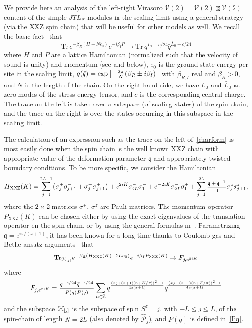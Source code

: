 \documentclass[11pt]{article}
\newcommand{\q}{\mathfrak{q}}
\newcommand{\ffrac}[2]{\mbox{\footnotesize$\displaystyle\frac{#1}{#2}$}}
\newcommand{\JTL}[1]{JTL_{#1}}
\newcommand{\HXXZ}{H_{\mathrm{XXZ}}(K)}
\newcommand{\PXXZ}{P_{\mathrm{XXZ}}(K)}
\newcommand{\oZ}{\mathbb{Z}}
\newcommand{\Vir}{\mathcal{V}}
\newcommand{\VirN}{\boldsymbol{\mathcal{V}}}
\newcommand{\APrTL}[1]{\widehat{\mathscr{P}}_{#1}}
\theoremstyle{definition}
\begin{document}
We provide here an  analysis of the left-right Virasoro $\VirN(2)=\Vir(2)\boxtimes\overline{\Vir}(2)$ content of the
simple $\JTL{N}$ modules in the scaling limit using a general strategy (via the XXZ spin chain) that will be useful for other models as well.
We recall the basic fact~\cite{Cardy} that
%
\begin{equation}
 \mathrm{Tr}\, e^{-\beta_R(H-Ne_0)}e^{-i\beta_I P}\to \mathrm{Tr}\, q^{L_0-c/24}\bar{q}^{\bar{L}_0-c/24}\label{charform}
 \end{equation}
where $H$ and $P$ are a lattice Hamiltonian (normalized such that
 the velocity of sound is unity) and momentum (see \cite{GRS1}
 and below), $e_0$ is the ground state energy per site in the
 scaling limit, $q(\bar{q})=\exp\left[-{2\pi\over N}(\beta_R\pm
 i\beta_I)\right]$ with $\beta_{R,I}$ real and $\beta_R>0$, and $N$ is
 the length of the chain. On the right-hand side, we have $L_0$ and $\bar{L}_0$ as zero modes of the stress-energy tensor, and $c$ is the corresponding central charge. The trace on the left is taken over a
 subspace (of scaling states) of the spin chain, and the trace on the right is over the
 states occurring in this subspace in the scaling limit.

The calculation of an expression such as the trace on the left
of~\eqref{charform} is most easily done when the spin chain is the
well known XXZ chain with appropriate value of the deformation
parameter $\q$ and appropriately twisted boundary conditions. To be
more specific, we consider the Hamiltonian
%
\begin{equation}
\HXXZ=\sum_{j=1}^{2L-1}
\bigl(\sigma^+_j\sigma^-_{j+1}+\sigma_j^-\sigma_{j+1}^+\bigr) + e^{2iK}\sigma^{+}_{2L}\sigma_{1}^{-}+ e^{-2iK}\sigma^{-}_{2L}\sigma_{1}^{+}
+\sum_{j=1}^{2L}\ffrac{\q+\q^{-1}}{4}\sigma_j^z\sigma_{j+1}^z,
\end{equation}
%
where the $2\times2$-matrices $\sigma^{\pm}$, $\sigma^z$ are Pauli
matrices.  The momentum operator $\PXXZ$ can be chosen either by
using the exact eigenvalues of the translation operator on the spin
chain, or by using the general formulas in~\cite{GRS1}. Parametrizing
$\q=e^{i\pi/(x+1)}$, it has been known for a long time thanks to
Coulomb gas and Bethe ansatz arguments~\cite{PasquierSaleur,Rittenbergetal} that %
%
 \begin{equation}
   \hbox{Tr}_{{\cal H}_{[j]}} e^{-\beta_R(\HXXZ-2Le_0)}e^{-i\beta_I \PXXZ}\to F_{j,e^{2iK}}
 \end{equation}
where
 \begin{equation}
  F_{j,e^{2iK}}=\ffrac{q^{-c/24}\bar{q}^{-c/24}}{P(q)P(\bar{q})}
     \sum_{n\in \oZ}q^{\left(xj+(x+1)(n+K/\pi)\right)^{2}-1\over 4x(x+1)}
    \bar{q}^{\left(xj-(x+1)(n+K/\pi)\right)^{2}-1\over 4x(x+1)}\label{contlimtr}
     \end{equation}
and the subspace ${\cal H}_{[j]}$ is the subspace of  spin $S^z=j$, with $-L\leq
j\leq L$, of the spin-chain of length $N=2L$ (also denoted by $\APrTL{j}$),
and $P(q)$ is defined in~\eqref{Pq}.
\end{document}
